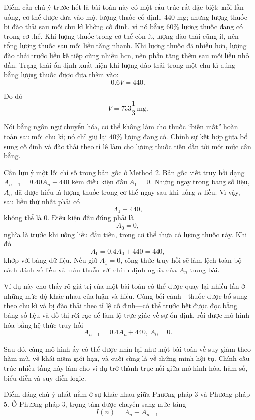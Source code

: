   {
    \vspace{.5\baselineskip}
    Điểm cần chú ý trước hết là bài toán này có một cấu trúc rất đặc biệt: mỗi lần uống, cơ thể được đưa vào một lượng thuốc cố định, $440$ mg; nhưng lượng thuốc bị đào thải sau mỗi chu kì không cố định, vì nó bằng $60\%$ lượng thuốc đang có trong cơ thể. Khi lượng thuốc trong cơ thể còn ít, lượng đào thải cũng ít, nên tổng lượng thuốc sau mỗi liều tăng nhanh. Khi lượng thuốc đã nhiều hơn, lượng đào thải trước liều kế tiếp cũng nhiều hơn, nên phần tăng thêm sau mỗi liều nhỏ dần. Trạng thái ổn định xuất hiện khi lượng đào thải trong một chu kì đúng bằng lượng thuốc được đưa thêm vào:
    $$
    0.6V=440.
    $$

    Do đó
    $$
    V=733\frac{1}{3}\, \text{mg}.
    $$

    Nói bằng ngôn ngữ chuyển hóa, cơ thể không làm cho thuốc ``biến mất'' hoàn toàn sau mỗi chu kì; nó chỉ giữ lại $40\%$ lượng đang có. Chính sự kết hợp giữa bổ sung cố định và đào thải theo tỉ lệ làm cho lượng thuốc tiến dần tới một mức cân bằng.

    Cần lưu ý một lỗi chỉ số trong bản gốc ở Method 2. Bản gốc viết truy hồi dạng $A_{n+1}=0.40A_n+440$ kèm điều kiện đầu $A_1=0$. Nhưng ngay trong bảng số liệu, $A_n$ đã được hiểu là lượng thuốc trong cơ thể ngay sau khi uống $n$ liều. Vì vậy, sau liều thứ nhất phải có
    $$
    A_1=440,
    $$
    không thể là $0$. Điều kiện đầu đúng phải là
    $$
    A_0=0,
    $$
    nghĩa là trước khi uống liều đầu tiên, trong cơ thể chưa có lượng thuốc này. Khi đó
    $$
    A_1=0.4A_0+440=440,
    $$
    khớp với bảng dữ liệu. Nếu giữ $A_1=0$, công thức truy hồi sẽ làm lệch toàn bộ cách đánh số liều và mâu thuẫn với chính định nghĩa của $A_n$ trong bài.

    Ví dụ này cho thấy rõ giá trị của một bài toán có thể được quay lại nhiều lần ở những mức độ khác nhau của luận và hiểu. Cùng bối cảnh---thuốc được bổ sung theo chu kì và bị đào thải theo tỉ lệ cố định---có thể trước hết được đọc bằng bảng số liệu và đồ thị rời rạc để làm lộ trực giác về sự ổn định, rồi được mô hình hóa bằng hệ thức truy hồi
    $$
    A_{n+1}=0.4A_n+440,\, A_0=0.
    $$

    Sau đó, cùng mô hình ấy có thể được nhìn lại như một bài toán về suy giảm theo hàm mũ, về khái niệm giới hạn, và cuối cùng là về chứng minh hội tụ. Chính cấu trúc nhiều tầng này làm cho ví dụ trở thành trục nối giữa mô hình hóa, hàm số, biểu diễn và suy diễn logic.

    Điểm đáng chú ý nhất nằm ở sự khác nhau giữa Phương pháp 3 và Phương pháp 5. Ở Phương pháp 3, trọng tâm được chuyển sang mức tăng
    $$
    I(n)=A_n-A_{n-1}.
    $$

}
